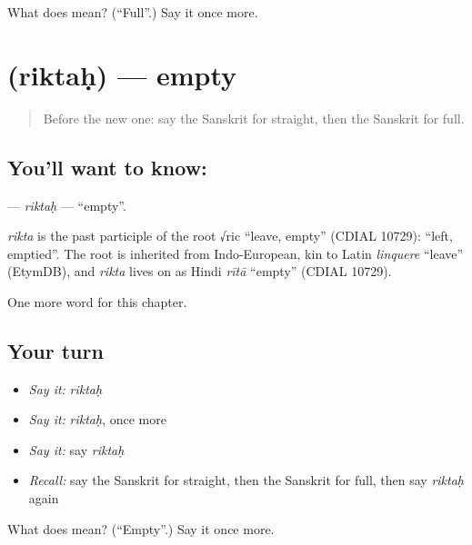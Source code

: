 \begin{tcolorbox}[breakable,colback=teal!4,colframe=teal!35!black,title={Before you move on}]
What does  mean? (\textquotedblleft{}Full\textquotedblright{}.) Say it once more.
\end{tcolorbox}
\section[\texorpdfstring{\sk{रिक्तः} (riktaḥ)}{रिक्तः (riktaḥ)}]{ (riktaḥ) — empty}

\label{lesson:SA-C132-riktah}



\begin{quote}
Before the new one: say the Sanskrit for straight, then the Sanskrit for full.
\end{quote}

\subsection*{You'll want to know: }
\textbf{} — \emph{riktaḥ} — \textquotedblleft{}empty\textquotedblright{}.

\begin{cousinweb}
\emph{rikta} is the past participle of the root √ric \textquotedblleft{}leave, empty\textquotedblright{} (CDIAL 10729): \textquotedblleft{}left, emptied\textquotedblright{}. The root is inherited from Indo-European, kin to Latin \emph{linquere} \textquotedblleft{}leave\textquotedblright{} (EtymDB), and \emph{rikta} lives on as Hindi \emph{rītā} \textquotedblleft{}empty\textquotedblright{} (CDIAL 10729).
\end{cousinweb}

\begin{grammarlens}[title={What you've built}]
One more word for this chapter.
\end{grammarlens}

\subsection*{Your turn}
\begin{itemize}
\raggedright
  \item \emph{Say it:} \emph{riktaḥ}
  \item \emph{Say it:} \emph{riktaḥ}, once more
  \item \emph{Say it:} say \emph{riktaḥ}
  \item \emph{Recall:} say the Sanskrit for straight, then the Sanskrit for full, then say \emph{riktaḥ} again
\end{itemize}

\begin{tcolorbox}[breakable,colback=teal!4,colframe=teal!35!black,title={Before you move on}]
What does  mean? (\textquotedblleft{}Empty\textquotedblright{}.) Say it once more.
\end{tcolorbox}
